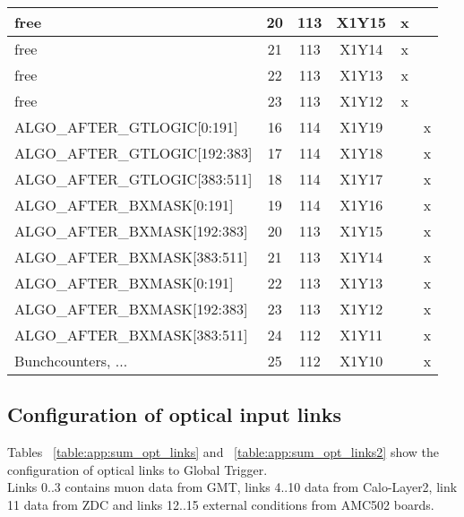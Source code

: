 \begin{longtable}{|l|c|c|c|c|c|}
free & 20  & 113 & X1Y15 & x &   \\\hline
free & 21  & 113 & X1Y14 & x &   \\\hline
free & 22  & 113 & X1Y13 & x &   \\\hline
free & 23  & 113 & X1Y12 & x &   \\\hline\hline
ALGO\_AFTER\_GTLOGIC[0:191] & 16  & 114 & X1Y19 &   & x \\\hline
ALGO\_AFTER\_GTLOGIC[192:383] & 17  & 114 & X1Y18 &   & x \\\hline
ALGO\_AFTER\_GTLOGIC[383:511] & 18  & 114 & X1Y17 &   & x \\\hline
ALGO\_AFTER\_BXMASK[0:191] & 19  & 114 & X1Y16 &   & x \\\hline
ALGO\_AFTER\_BXMASK[192:383] & 20  & 113 & X1Y15 &   & x \\\hline
ALGO\_AFTER\_BXMASK[383:511] & 21  & 113 & X1Y14 &   & x \\\hline
ALGO\_AFTER\_BXMASK[0:191] & 22  & 113 & X1Y13 &   & x \\\hline
ALGO\_AFTER\_BXMASK[192:383] & 23  & 113 & X1Y12 &   & x \\\hline
ALGO\_AFTER\_BXMASK[383:511] & 24  & 112 & X1Y11 &   & x \\\hline
Bunchcounters, ... & 25  & 112 & X1Y10 &   & x \\\hline
\end{longtable}

\clearpage

\subsection{Configuration of optical input links}\label{sec:app:app_b}

Tables ~\ref{table:app:sum_opt_links} and ~\ref{table:app:sum_opt_links2} show the configuration of optical links to Global Trigger.\\
Links 0..3 contains muon data from GMT, links 4..10 data from Calo-Layer2, link 11 data from ZDC and links 12..15 external conditions
from AMC502 boards.

